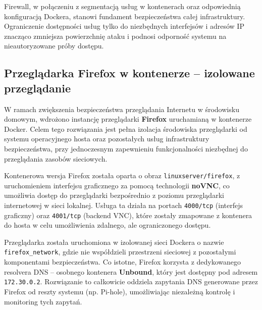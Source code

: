 \documentclass[
    left=2.5cm,         %
    right=2.5cm,        %
    top=2.5cm,          %
    bottom=3cm,         %
    bindingoffset=6mm,  %
    nohyphenation=true %
]{eiti/eiti-thesis} %
\begin{document}
Firewall, w połączeniu z segmentacją usług w kontenerach oraz odpowiednią konfiguracją Dockera, stanowi fundament bezpieczeństwa całej infrastruktury. Ograniczenie dostępności usług tylko do niezbędnych interfejsów i adresów IP znacząco zmniejsza powierzchnię ataku i podnosi odporność systemu na nieautoryzowane próby dostępu.


\subsection{Przeglądarka Firefox w kontenerze – izolowane przeglądanie}

W ramach zwiększenia bezpieczeństwa przeglądania Internetu w środowisku domowym, wdrożono instancję przeglądarki \textbf{Firefox} uruchamianą w kontenerze Docker. Celem tego rozwiązania jest pełna izolacja środowiska przeglądarki od systemu operacyjnego hosta oraz pozostałych usług infrastruktury bezpieczeństwa, przy jednoczesnym zapewnieniu funkcjonalności niezbędnej do przeglądania zasobów sieciowych.

Kontenerowa wersja Firefox została oparta o obraz \texttt{linuxserver/firefox}, z uruchomieniem interfejsu graficznego za pomocą technologii \textbf{noVNC}, co umożliwia dostęp do przeglądarki bezpośrednio z poziomu przeglądarki internetowej w sieci lokalnej. Usługa ta działa na portach \texttt{4000/tcp} (interfejs graficzny) oraz \texttt{4001/tcp} (backend VNC), które zostały zmapowane z kontenera do hosta w celu umożliwienia zdalnego, ale ograniczonego dostępu.

Przeglądarka została uruchomiona w izolowanej sieci Dockera o nazwie \texttt{firefox\_network}, gdzie nie współdzieli przestrzeni sieciowej z pozostałymi komponentami bezpieczeństwa. Co istotne, Firefox korzysta z dedykowanego resolvera DNS – osobnego kontenera \textbf{Unbound}, który jest dostępny pod adresem \texttt{172.30.0.2}. Rozwiązanie to całkowicie oddziela zapytania DNS generowane przez Firefox od reszty systemu (np. Pi-hole), umożliwiając niezależną kontrolę i monitoring tych zapytań.
\end{document}
